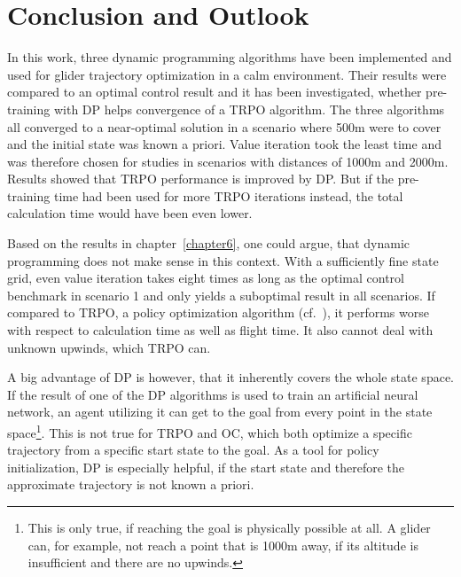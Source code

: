 \chapter{Conclusion and Outlook}
\label{chapter8}
In this work, three dynamic programming algorithms have been implemented and used for glider trajectory optimization in a calm environment. Their results were compared to an optimal control result and it has been investigated, whether pre-training with DP helps convergence of a TRPO algorithm. The three algorithms all converged to a near-optimal solution in a scenario where 500m were to cover and the initial state was known a priori. Value iteration took the least time and was therefore chosen for studies in scenarios with distances of 1000m and 2000m. Results showed that TRPO performance is improved by DP. But if the pre-training time had been used for more TRPO iterations instead, the total calculation time would have been even lower.

Based on the results in chapter~\ref{chapter6}, one could argue, that dynamic programming does not make sense in this context. With a sufficiently fine state grid, even value iteration takes eight times as long as the optimal control benchmark in scenario 1 and only yields a suboptimal result in all scenarios. If compared to TRPO, a policy optimization algorithm (cf.~\cite{Zuern2017}), it performs worse with respect to calculation time as well as flight time. It also cannot deal with unknown upwinds, which TRPO can.

A big advantage of DP is however, that it inherently covers the whole state space. If the result of one of the DP algorithms is used to train an artificial neural network, an agent utilizing it can get to the goal from every point in the state space\footnote{This is only true, if reaching the goal is physically possible at all. A glider can, for example, not reach a point that is 1000m away, if its altitude is insufficient and there are no upwinds.}. This is not true for TRPO and OC, which both optimize a specific trajectory from a specific start state to the goal. As a tool for policy initialization, DP is especially helpful, if the start state and therefore the approximate trajectory is not known a priori.

